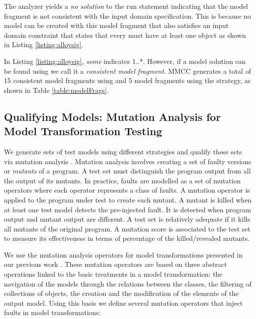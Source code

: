 	

	

The {\Alloy} analyzer yields a \emph{no solution} to the run statement indicating that the model fragment is not consistent with the input domain specification. This is because no model can be created with this model fragment that also satisfies an input domain constraint that states that every {\Class} must have at least one {\Property} object as shown in Listing \ref{listing:alloysig}.


	

In Listing \ref{listing:alloysig},  \emph{some} indicates 1..*.  However, if a model solution can be found using {\Alloy} we call it a \emph{consistent model fragment}. MMCC generates a total of 15 consistent model fragments using {\AllRanges} and 5 model fragments using the {\AllPartitions} strategy, as shown in Table \ref{table:modelFrags}.


\subsection{Qualifying Models: Mutation Analysis for Model Transformation Testing}
\label{sec:sec:ma}

We generate sets of test models using different strategies and qualify these sets via mutation analysis \cite{demillo1978}. Mutation analysis involves creating a set of faulty versions or \emph{mutants} of a program. A test set must distinguish the program output from all the output of its mutants. In practice, faults are modelled as a set of mutation operators where each operator represents a class of faults. A mutation operator is applied to the program under test to create each mutant. A mutant is killed when at least one test model detects the pre-injected fault. It is detected when program output and mutant output are different. A test set is relatively adequate if it kills all mutants of the original program.  A mutation score is associated to the test set to measure its effectiveness in terms of percentage of the killed/revealed mutants.

We use the mutation analysis operators for model transformations presented in our previous work \cite{mottu2006}. These mutation operators are based on three abstract operations linked to the basic treatments in a model transformation: the navigation of the models through the relations between the classes, the filtering of collections of objects, the creation and the modification of the elements of the output model. Using this basis we define several mutation operators that inject faults in model transformations:

